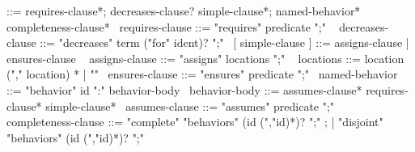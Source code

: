 \begin{syntax}
   ::= requires-clause*;
                            { decreases-clause? } simple-clause*;
                            named-behavior* { completeness-clause* }
  \
  requires-clause ::= "requires" predicate ";"
  \
  { decreases-clause } ::= { "decreases" term ("for" ident)? ";" }
  \
  [ simple-clause ] ::= { assigns-clause } | ensures-clause
  \
  { assigns-clause } ::= { "assigns" locations ";" }
  \
  { locations } ::= { location ("," location) * | "\nothing" }
  \
  ensures-clause ::= "ensures" predicate ";"
  \
  named-behavior ::= "behavior" id ":" behavior-body
  \
  behavior-body ::= assumes-clause* requires-clause* simple-clause*
  \
  assumes-clause ::= "assumes" predicate ";"
  \
  { completeness-clause } ::= { "complete" "behaviors" (id (","id)*)? ";" } ;
     | { "disjoint" "behaviors" (id (","id)*)? ";" }
\end{syntax}
